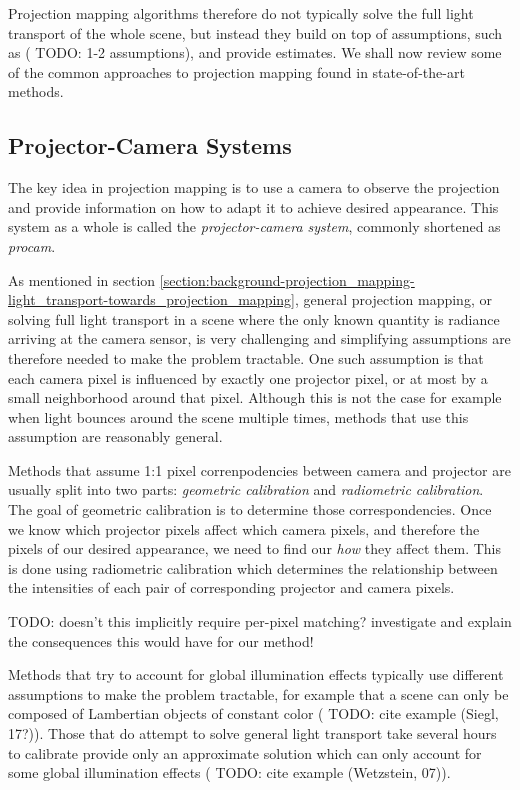 Projection mapping algorithms therefore do not typically solve the full light transport of the whole scene, but instead they build on top of assumptions, such as ({\color{red} TODO: 1-2 assumptions}), and provide estimates. We shall now review some of the common approaches to projection mapping found in state-of-the-art methods.

\subsection{Projector-Camera Systems}
\label{section:background-projection_mapping-procams}

The key idea in projection mapping is to use a camera to observe the projection and provide information on how to adapt it to achieve desired appearance. This system as a whole is called the \textit{projector-camera system}, commonly shortened as \textit{procam}.

As mentioned in section \ref{section:background-projection_mapping-light_transport-towards_projection_mapping}, general projection mapping, or solving full light transport in a scene where the only known quantity is radiance arriving at the camera sensor, is very challenging and simplifying assumptions are therefore needed to make the problem tractable. One such assumption is that each camera pixel is influenced by exactly one projector pixel, or at most by a small neighborhood around that pixel. Although this is not the case for example when light bounces around the scene multiple times, methods that use this assumption are reasonably general.

Methods that assume 1:1 pixel correnpodencies between camera and projector are usually split into two parts: \textit{geometric calibration} and \textit{radiometric calibration}. The goal of geometric calibration is to determine those correspondencies. Once we know which projector pixels affect which camera pixels, and therefore the pixels of our desired appearance, we need to find our \textit{how} they affect them. This is done using radiometric calibration which determines the relationship between the intensities of each pair of corresponding projector and camera pixels.

{\color{red} TODO: doesn't this implicitly require per-pixel matching? investigate and explain the consequences this would have for our method!}

Methods that try to account for global illumination effects typically use different assumptions to make the problem tractable, for example that a scene can only be composed of Lambertian objects of constant color ({\color{red} TODO: cite example (Siegl, 17?)}). Those that do attempt to solve general light transport take several hours to calibrate provide only an approximate solution which can only account for some global illumination effects ({\color{red} TODO: cite example (Wetzstein, 07)}).

